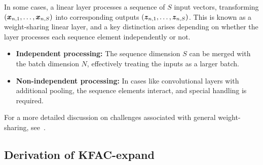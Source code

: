 \begin{caveat} 
  In some cases, a linear layer processes a sequence of $S$ input vectors, transforming $({\bm{x}}_{n,1}, \dots, {\bm{x}}_{n, S})$ into corresponding outputs $({\bm{z}}_{n, 1}, \dots, {\bm{z}}_{n, S})$.
  This is known as a weight-sharing linear layer, and a key distinction arises depending on whether the layer processes each sequence element independently or not.
  \begin{itemize}
    \item \textbf{Independent processing:} The sequence dimension $S$ can be merged with the batch dimension $N$, effectively treating the inputs as a larger batch.
    \item \textbf{Non-independent processing:} In cases like convolutional layers with additional pooling, the sequence elements interact, and special handling is required.
  \end{itemize}
  
  For a more detailed discussion on challenges associated with general weight-sharing, see~\citet{eschenhagen2023kroneckerfactored}.
\end{caveat}

\switchcolumn[1]
\switchcolumn[0]

\subsection{Derivation of KFAC-expand}

